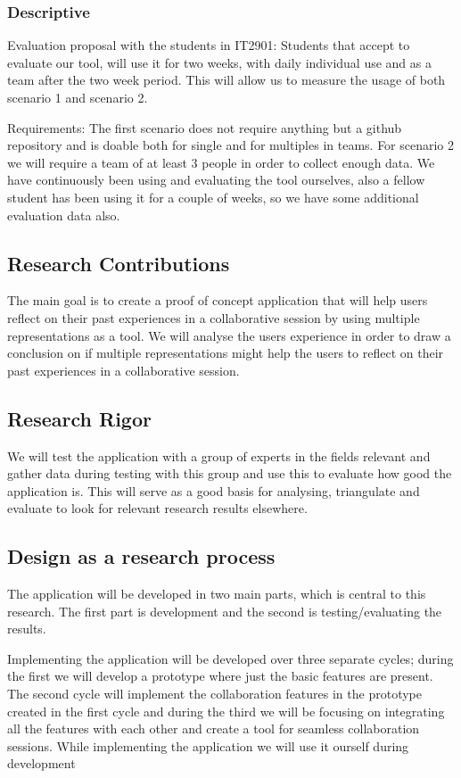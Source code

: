 \subsubsection{Descriptive}
Evaluation proposal with the students in IT2901: 
Students that accept to evaluate our tool, will use it for two weeks, with daily individual use and as a team after the two week period. This will allow us to measure the
usage of both scenario 1 and scenario 2.

Requirements: 
The first scenario does not require anything but a github repository and is doable both for single and for multiples in teams.
For scenario 2 we will require a team of at least 3 people in order to collect enough data. 
We have continuously been using and evaluating the tool ourselves, also a fellow student has been using it for a couple of weeks, so we have some additional evaluation
data also.

\subsection{Research Contributions}
The main goal is to create a proof of concept application that will help users reflect on their past experiences in a collaborative session by using multiple representations as a tool. 
We will analyse the users experience in order to draw a conclusion on if multiple representations might help the users to reflect on their past experiences in a collaborative session.

\subsection{Research Rigor}
 We will test the application with a group of experts in the fields relevant and gather data during testing with this group and use this to evaluate how good the application is. This will serve as a good basis for analysing, triangulate and evaluate to look for relevant research results elsewhere.

\subsection{Design as a research process}
The application will be developed in two main parts, which is central to this research. The first part is development and the second is testing/evaluating the results.

Implementing the application will be developed over three separate cycles; during the first we will develop a prototype where just the basic features are present. The second cycle will implement the collaboration features in the prototype created in the first cycle and during the third we will be focusing on integrating all the features with each other and create a tool for seamless collaboration sessions. While implementing the application we will use it ourself during development

